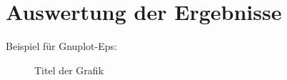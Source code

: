 \documentclass[12pt,a4paper,titlepage]{article}
\begin{document}
\section{Auswertung der Ergebnisse}

Beispiel für Gnuplot-Eps:

\begin{figure}[h]
	\centering
	\caption{Titel der Grafik}
	\label{labelname}
\end{figure}
\end{document}
